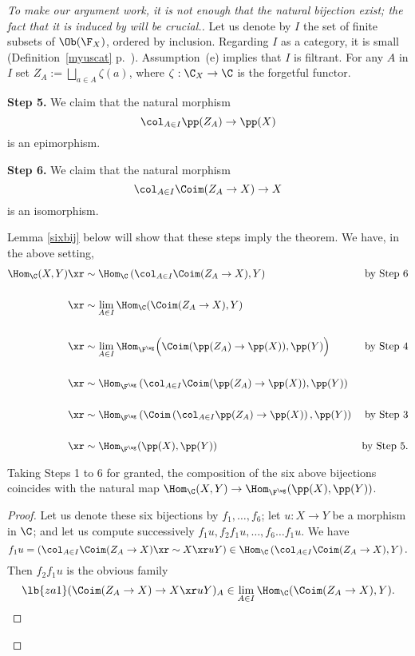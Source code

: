 \documentclass[12pt]{article}
\theoremstyle{remark}
\theoremstyle{definition}
\begin{document}
\begin{proof}
[To make our argument work, it is not enough that the natural bijection  exist; the fact that it is induced by  will be crucial.] 

Let us denote by $I$ the set of finite subsets of $\Ob(\F_X)$, ordered by inclusion. Regarding $I$ as a category, it is small (Definition~\ref{myuscat} p.~). Assumption~(e) implies that $I$ is filtrant. For any $A$ in $I$ set $Z_A:=\bigsqcup_{a\in A}\zeta(a)$, where $\zeta:\C_X\to\C$ is the forgetful functor.

\nn\textbf{Step 5.} We claim that the natural morphism 
$$
\col_{A\in I}\pp(Z_A)\to\pp(X) 
$$ 
is an epimorphism.

\nn\textbf{Step 6.} We claim that the natural morphism 
$$
\col_{A\in I}\Coim(Z_A\to X)\to X
$$ 
is an isomorphism.

Lemma \ref{sixbij} below will show that these steps imply the theorem. We have, in the above setting, 
\begin{align*} 
\Hom_\C(X,Y)&\xr\sim\Hom_\C\left(\col_{A\in I}\Coim(Z_A\to X),Y\right)&\text{by Step 6}\\ \\ 
&\xr\sim\lim_{A\in I}\Hom_\C(\Coim(Z_A\to X),Y)\\ \\ 
&\xr\sim\lim_{A\in I}\Hom_{\F^\wg}\Big(\Coim(\pp(Z_A)\to\pp(X)),\pp(Y)\Big)&\text{by Step 4}\\ \\ 
&\xr\sim\Hom_{\F^\wg}\left(\col_{A\in I}\Coim(\pp(Z_A)\to\pp(X)),\pp(Y)\right)\\ \\ 
&\xr\sim\Hom_{\F^\wg}\left(\Coim\left(\col_{A\in I}\pp(Z_A)\to\pp(X)\right),\pp(Y)\right)&\text{by Step 3}\\ \\ 
&\xr\sim\Hom_{\F^\wg}(\pp(X),\pp(Y))&\text{by Step 5.}
\end{align*} 

\begin{lem} 
Taking Steps 1 to 6 for granted, the composition of the six above bijections coincides with the natural map $\Hom_\C(X,Y)\to\Hom_{\F^\wg}(\pp(X),\pp(Y))$.  
\end{lem}

\begin{proof}
Let us denote these six bijections by $f_1,\dots,f_6$; let $u:X\to Y$ be a morphism in $\C$; and let us compute successively $f_1u,f_2f_1u,\dots,f_6\dots f_1u$. We have 
$$
f_1u=\left(\col_{A\in I}\Coim(Z_A\to X)\xr\sim X\xr uY\right)\in\Hom_\C\left(\col_{A\in I}\Coim(Z_A\to X),Y\right).
$$ 
Then $f_2f_1u$ is the obvious family 
\begin{equation}\lb{za1}
(\Coim(Z_A\to X)\to X\xr uY)_A\in\lim_{A\in I}\Hom_\C(\Coim(Z_A\to X),Y).
\end{equation}


\end{proof}
\end{proof}
\end{document}
